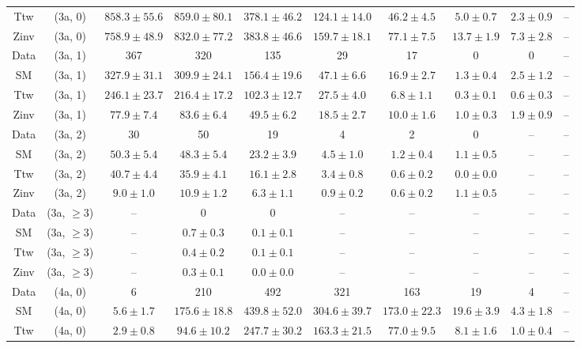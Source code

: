 \begin{table}[h!]
{\begin{tabular}{cccccccccc}
	Ttw & (3a, 0) & $858.3\pm 55.6$ & $859.0\pm 80.1$ & $378.1\pm 46.2$ & $124.1\pm 14.0$ & $46.2\pm 4.5$ & $5.0\pm 0.7$ & $2.3\pm 0.9$ & -- \\[0.5ex] 
	Zinv & (3a, 0) & $758.9\pm 48.9$ & $832.0\pm 77.2$ & $383.8\pm 46.6$ & $159.7\pm 18.1$ & $77.1\pm 7.5$ & $13.7\pm 1.9$ & $7.3\pm 2.8$ & -- \\[0.5ex] 
	Data & (3a, 1) & 367 & 320 & 135 & 29 & 17 & 0 & 0 & -- \\[0.5ex] 
	SM & (3a, 1) & $327.9\pm 31.1$ & $309.9\pm 24.1$ & $156.4\pm 19.6$ & $47.1\pm 6.6$ & $16.9\pm 2.7$ & $1.3\pm 0.4$ & $2.5\pm 1.2$ & -- \\[0.5ex] 
	Ttw & (3a, 1) & $246.1\pm 23.7$ & $216.4\pm 17.2$ & $102.3\pm 12.7$ & $27.5\pm 4.0$ & $6.8\pm 1.1$ & $0.3\pm 0.1$ & $0.6\pm 0.3$ & -- \\[0.5ex] 
	Zinv & (3a, 1) & $77.9\pm 7.4$ & $83.6\pm 6.4$ & $49.5\pm 6.2$ & $18.5\pm 2.7$ & $10.0\pm 1.6$ & $1.0\pm 0.3$ & $1.9\pm 0.9$ & -- \\[0.5ex] 
	Data & (3a, 2) & 30 & 50 & 19 & 4 & 2 & 0 & -- & -- \\[0.5ex] 
	SM & (3a, 2) & $50.3\pm 5.4$ & $48.3\pm 5.4$ & $23.2\pm 3.9$ & $4.5\pm 1.0$ & $1.2\pm 0.4$ & $1.1\pm 0.5$ & -- & -- \\[0.5ex] 
	Ttw & (3a, 2) & $40.7\pm 4.4$ & $35.9\pm 4.1$ & $16.1\pm 2.8$ & $3.4\pm 0.8$ & $0.6\pm 0.2$ & $0.0\pm 0.0$ & -- & -- \\[0.5ex] 
	Zinv & (3a, 2) & $9.0\pm 1.0$ & $10.9\pm 1.2$ & $6.3\pm 1.1$ & $0.9\pm 0.2$ & $0.6\pm 0.2$ & $1.1\pm 0.5$ & -- & -- \\[0.5ex] 
	Data & (3a, $\ge3$) & -- & 0 & 0 & -- & -- & -- & -- & -- \\[0.5ex] 
	SM & (3a, $\ge3$) & -- & $0.7\pm 0.3$ & $0.1\pm 0.1$ & -- & -- & -- & -- & -- \\[0.5ex] 
	Ttw & (3a, $\ge3$) & -- & $0.4\pm 0.2$ & $0.1\pm 0.1$ & -- & -- & -- & -- & -- \\[0.5ex] 
	Zinv & (3a, $\ge3$) & -- & $0.3\pm 0.1$ & $0.0\pm 0.0$ & -- & -- & -- & -- & -- \\[0.5ex] 
	Data & (4a, 0) & 6 & 210 & 492 & 321 & 163 & 19 & 4 & -- \\[0.5ex] 
	SM & (4a, 0) & $5.6\pm 1.7$ & $175.6\pm 18.8$ & $439.8\pm 52.0$ & $304.6\pm 39.7$ & $173.0\pm 22.3$ & $19.6\pm 3.9$ & $4.3\pm 1.8$ & -- \\[0.5ex] 
	Ttw & (4a, 0) & $2.9\pm 0.8$ & $94.6\pm 10.2$ & $247.7\pm 30.2$ & $163.3\pm 21.5$ & $77.0\pm 9.5$ & $8.1\pm 1.6$ & $1.0\pm 0.4$ & -- \\[0.5ex] 

\end{tabular}}
\end{table}
